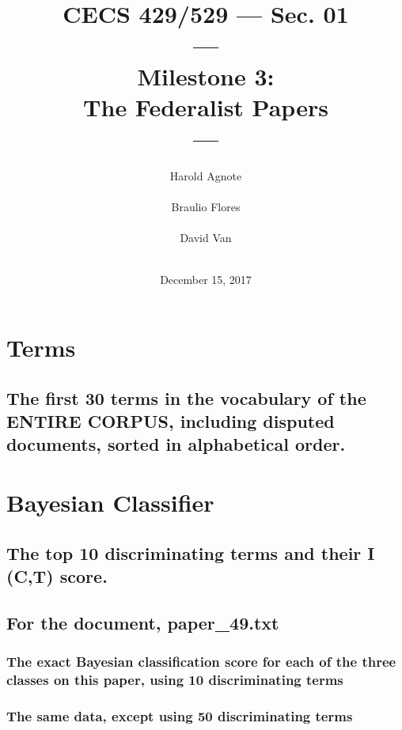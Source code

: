 \documentclass[12pt, letterpaper]{article}
\title{CECS 429/529 --- Sec. 01 \protect\\  --- \protect\\ Milestone
3: \protect\\ The Federalist Papers \protect\\ ---}
\author{Harold Agnote \\ \\ Braulio Flores \\ \\ David Van \\ \\}
\date{December 15, 2017}
\begin{document}
    \begin{titlepage}
        \maketitle
    \end{titlepage}

    \section{Terms}

    \lstset{style=mystyle}
   
    \subsection{ The first 30 terms in the vocabulary of the ENTIRE CORPUS, including
    disputed documents, sorted in alphabetical order.}
    

    \newpage

    \section{Bayesian Classifier}
    \subsection{The top 10 discriminating terms and their I (C,T) score.}
    

    

    \subsection{For the document, paper\_49.txt}
    \subsubsection{The exact Bayesian classification score for each of the
    three classes on this paper, using 10 discriminating terms}

    

    \subsubsection{The same data, except using 50 discriminating terms}
    
\end{document}
